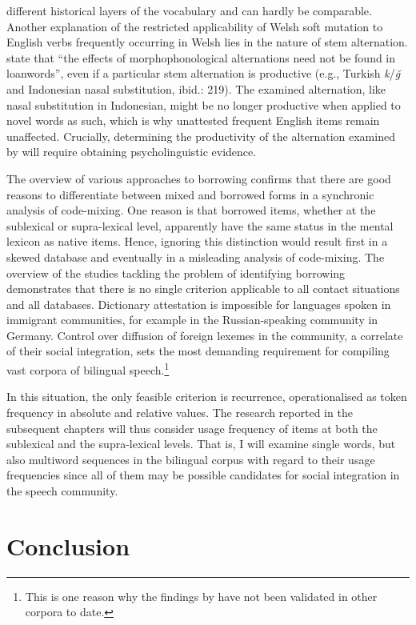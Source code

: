 different historical layers of the vocabulary and can hardly be comparable. Another explanation of the restricted applicability of Welsh soft mutation to English verbs frequently occurring in Welsh lies in the nature of stem alternation. \citet[][216]{haspelmath-sims} state that ``the effects of morphophonological alternations need not be found in loanwords'', even if a particular stem alternation is productive (e.g., Turkish \textit{k}\slash\textit{ğ} and Indonesian nasal substitution, ibid.: 219). The examined alternation, like nasal substitution in Indonesian, might be no longer productive when applied to novel words as such, which is why unattested frequent English items remain unaffected. Crucially, determining the productivity of the alternation examined by \citet{stammers-deuchar-2012} will require obtaining psycholinguistic evidence. 

The overview of various approaches to borrowing confirms that there are good reasons to differentiate between mixed and borrowed forms in a synchronic analysis of code-mixing. One reason is that borrowed items, whether at the sublexical or supra-lexical level, apparently have the same status in the mental lexicon as native items. Hence, ignoring this distinction would result first in a skewed database and eventually in a misleading analysis of code-mixing. The overview of the studies tackling the problem of identifying borrowing demonstrates that there is no single criterion applicable to all contact situations and all databases. Dictionary attestation is impossible for languages spoken in immigrant communities, for example in the Russian-speaking community in Germany. Control over diffusion of foreign lexemes in the community, a correlate of their social integration, sets the most demanding requirement for compiling vast corpora of bilingual speech.\footnote{This is one reason why the findings by \citet{poplack-etal-1988} have not been validated in other corpora to date.}

In this situation, the only feasible criterion is recurrence, operationalised as token frequency in absolute and relative values. The research reported in the subsequent chapters will thus consider usage frequency of items at both the sublexical and the supra-lexical levels. That is, I will examine single words, but also multiword sequences in the bilingual corpus with regard to their usage frequencies since all of them may be possible candidates for social integration in the speech community.

\section{Conclusion}

